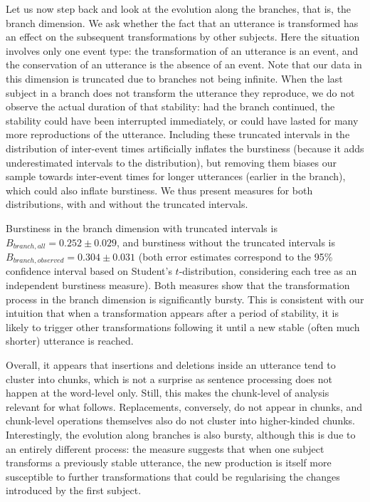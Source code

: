 Let us now step back and look at the evolution along the branches, that
is, the branch dimension. We ask whether the fact that an utterance is
transformed has an effect on the subsequent transformations by other
subjects. Here the situation involves only one event type: the
transformation of an utterance is an event, and the conservation of an
utterance is the absence of an event. Note that our data in this
dimension is truncated due to branches not being infinite. When the last
subject in a branch does not transform the utterance they reproduce, we
do not observe the actual duration of that stability: had the branch
continued, the stability could have been interrupted immediately, or
could have lasted for many more reproductions of the utterance.
Including these truncated intervals in the distribution of inter-event
times artificially inflates the burstiness (because it adds
underestimated intervals to the distribution), but removing them biases
our sample towards inter-event times for longer utterances (earlier in
the branch), which could also inflate burstiness. We thus present
measures for both distributions, with and without the truncated
intervals.

Burstiness in the branch dimension with truncated intervals is
\(B_{branch,all} = 0.252 \pm 0.029\), and burstiness without the
truncated intervals is \(B_{branch,observed} = 0.304 \pm 0.031\) (both
error estimates correspond to the 95\% confidence interval based on
Student's \(t\)-distribution, considering each tree as an independent
burstiness measure). Both measures show that the transformation process
in the branch dimension is significantly bursty. This is consistent with
our intuition that when a transformation appears after a period of
stability, it is likely to trigger other transformations following it
until a new stable (often much shorter) utterance is reached.

\bigskip
Overall, it appears that insertions and deletions inside an utterance
tend to cluster into chunks, which is not a surprise as sentence
processing does not happen at the word-level only. Still, this makes the
chunk-level of analysis relevant for what follows. Replacements,
conversely, do not appear in chunks, and chunk-level operations
themselves also do not cluster into higher-kinded chunks. Interestingly,
the evolution along branches is also bursty, although this is due to an
entirely different process: the measure suggests that when one subject
transforms a previously stable utterance, the new production is itself
more susceptible to further transformations that could be regularising
the changes introduced by the first subject.


